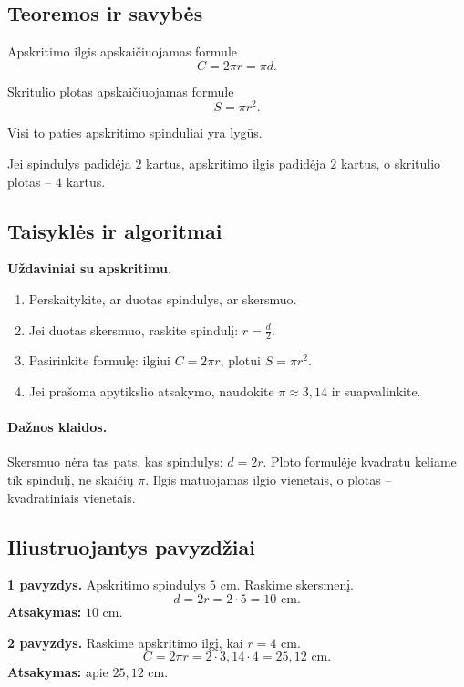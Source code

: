 \subsection{Teoremos ir savybės}
\begin{savybe}
Apskritimo ilgis apskaičiuojamas formule
\[
C=2\pi r=\pi d.
\]
\end{savybe}
\begin{savybe}
Skritulio plotas apskaičiuojamas formule
\[
S=\pi r^2.
\]
\end{savybe}
\begin{savybe}
Visi to paties apskritimo spinduliai yra lygūs.
\end{savybe}
\begin{savybe}
Jei spindulys padidėja \(2\) kartus, apskritimo ilgis padidėja \(2\) kartus, o skritulio plotas -- \(4\) kartus.
\end{savybe}

\subsection{Taisyklės ir algoritmai}
\textbf{Uždaviniai su apskritimu.}
\begin{enumerate}[label=\arabic*.]
\item Perskaitykite, ar duotas spindulys, ar skersmuo.
\item Jei duotas skersmuo, raskite spindulį: \(r=\frac{d}{2}\).
\item Pasirinkite formulę: ilgiui \(C=2\pi r\), plotui \(S=\pi r^2\).
\item Jei prašoma apytikslio atsakymo, naudokite \(\pi\approx 3,14\) ir suapvalinkite.
\end{enumerate}

\paragraph{Dažnos klaidos.}
Skersmuo nėra tas pats, kas spindulys: \(d=2r\). Ploto formulėje kvadratu keliame tik spindulį, ne skaičių \(\pi\). Ilgis matuojamas ilgio vienetais, o plotas -- kvadratiniais vienetais.

\subsection{Iliustruojantys pavyzdžiai}
\textbf{1 pavyzdys.} Apskritimo spindulys \(5\) cm. Raskime skersmenį.
\[
d=2r=2\cdot 5=10\text{ cm}.
\]
\textbf{Atsakymas:} \(10\) cm.

\textbf{2 pavyzdys.} Raskime apskritimo ilgį, kai \(r=4\) cm.
\[
C=2\pi r=2\cdot 3,14\cdot 4=25,12\text{ cm}.
\]
\textbf{Atsakymas:} apie \(25,12\) cm.


